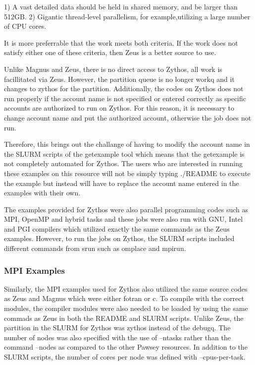 \documentclass[journal]{IEEEtran}
\begin{document}
1) A vast detailed data should be held in shared memory, and be larger than 512GB.
2) Gigantic thread-level parallelism, for example,utilizing a large number of CPU cores.

It is more preferrable that the work meets both criteria. If the work does not satisfy either one of these criteria, then Zeus is a better source to
use.

Unlike Magnus and Zeus, there is no direct access to Zythos, all work is facillitated via Zeus. However, the partition queue is no longer workq and it
changes to zythos for the partition. Additionally, the codes on Zythos does not run properly if the account name is not specified or entered correctly
as specific accounts are authorized to run on Zythos. For this reason, it is necessary to change account name and put the authorized account, otherwise 
the job does not run.

Therefore, this brings out the challange of having to modify the account name in the SLURM scripts of the getexample tool which means that the
getexample is not completely automated for Zythos. The users who are interested in running these examples on this resource will not be simply typing
./README to execute the example but instead will have to replace the account name entered in the examples with their own.

The examples provided for Zythos were also parallel programming codes such as MPI, OpenMP and hybrid tasks and these jobs were also run with GNU, Intel
and PGI compilers which utilized exactly the same commands as the Zeus examples. However, to run the jobs on Zythos, the SLURM scripts included
different commands from srun such as omplace and mpirun. 


\subsubsection{MPI Examples}

Similarly, the MPI examples used for Zythos also utilized the same source codes as Zeus and Magnus which were either fotran or c. To compile with the
correct modules, the compiler modules were also needed to be loaded by using the same commads as Zeus in both the README and SLURM scripts. Unlike Zeus, 
the partition in the SLURM for Zythos was zythos instead of the debugq. The number of nodes was also specified with the use of --ntasks rather than the 
command --nodes as compared to the other Pawsey resources. In addition to the SLURM scripts, the number of cores per node was defined with 
--cpus-per-task.    
\end{document}
